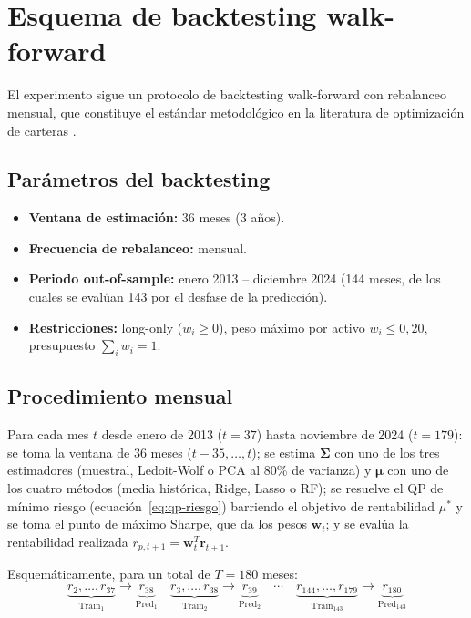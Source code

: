 \section{Esquema de backtesting walk-forward}

El experimento sigue un protocolo de backtesting walk-forward con
rebalanceo mensual, que constituye el estándar metodológico en la literatura
de optimización de carteras \cite{DeMiguel2009}.

\subsection{Parámetros del backtesting}

\begin{itemize}
    \item \textbf{Ventana de estimación:} 36 meses (3 años).
    \item \textbf{Frecuencia de rebalanceo:} mensual.
    \item \textbf{Periodo out-of-sample:} enero 2013 -- diciembre 2024
          (144 meses, de los cuales se evalúan 143 por el desfase de la
          predicción).
    \item \textbf{Restricciones:} long-only ($w_i \ge 0$), peso máximo por
          activo $w_i \le 0{,}20$, presupuesto $\sum_i w_i = 1$.
\end{itemize}

\subsection{Procedimiento mensual}

Para cada mes $t$ desde enero de 2013 ($t = 37$) hasta noviembre de 2024
($t = 179$): se toma la ventana de 36 meses ($t-35, \dots, t$); se estima
$\boldsymbol{\Sigma}$ con uno de los tres estimadores (muestral, Ledoit-Wolf o
PCA al 80\% de varianza) y $\boldsymbol{\mu}$ con uno de los cuatro métodos
(media histórica, Ridge, Lasso o RF); se resuelve el QP de mínimo riesgo
(ecuación~\ref{eq:qp-riesgo}) barriendo el objetivo de rentabilidad $\mu^*$ y
se toma el punto de
máximo Sharpe, que da los pesos $\mathbf{w}_t$; y se evalúa la rentabilidad
realizada $r_{p,t+1} = \mathbf{w}_t^T \mathbf{r}_{t+1}$.

Esquemáticamente, para un total de $T=180$ meses:
\[
\underbrace{r_2, \dots, r_{37}}_{\text{Train}_1} \to
\underbrace{r_{38}}_{\text{Pred}_1} \quad
\underbrace{r_3, \dots, r_{38}}_{\text{Train}_2} \to
\underbrace{r_{39}}_{\text{Pred}_2} \quad
\cdots \quad
\underbrace{r_{144}, \dots, r_{179}}_{\text{Train}_{143}} \to
\underbrace{r_{180}}_{\text{Pred}_{143}}
\]

